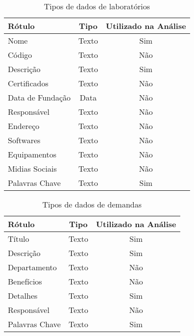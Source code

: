 \begin{table}[htb]
    \caption{Tipos de dados de laboratórios}
    \label{tab:dados_labs}
    \begin{tabularx}{\textwidth}{@{\extracolsep{\fill}}lcc}
        \hline
        \textbf{Rótulo}  & \textbf{Tipo} & \textbf{Utilizado na Análise} \\ \hline
        Nome             & Texto         & Sim                           \\
        Código           & Texto         & Não                           \\
        Descrição        & Texto         & Sim                           \\
        Certificados     & Texto         & Não                           \\
        Data de Fundação & Data          & Não                           \\
        Responsável      & Texto         & Não                           \\
        Endereço         & Texto         & Não                           \\
        Softwares        & Texto         & Não                           \\
        Equipamentos     & Texto         & Não                           \\
        Midias Sociais   & Texto         & Não                           \\
        Palavras Chave   & Texto         & Sim                           \\ \hline
    \end{tabularx}
    \fonte{}
\end{table}

\begin{table}[htb]
    \caption{Tipos de dados de demandas}
    \label{tab:dados_demandas}
    \begin{tabularx}{\textwidth}{@{\extracolsep{\fill}}lcc}
        \hline
        \textbf{Rótulo} & \textbf{Tipo} & \textbf{Utilizado na Análise} \\ \hline
        Título          & Texto         & Sim                           \\
        Descrição       & Texto         & Sim                           \\
        Departamento    & Texto         & Não                           \\
        Benefícios      & Texto         & Não                           \\
        Detalhes        & Texto         & Sim                           \\
        Responsável     & Texto         & Não                           \\
        Palavras Chave  & Texto         & Sim                           \\ \hline
    \end{tabularx}
    \fonte{}
\end{table}


